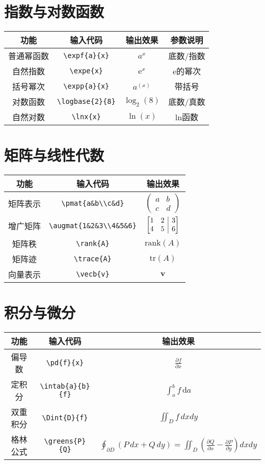 \documentclass[12pt,a4paper]{ctexart}
\makeatletter
\newcommand{\expf}[2]{#1^{#2}}  %
\newcommand{\expe}[1]{\mathrm{e}^{#1}}  %
\newcommand{\expp}[2]{#1^{\left( #2 \right)}}  %
\newcommand{\logbase}[2]{\log_{#1}\left( #2 \right)}  %
\newcommand{\lnx}[1]{\ln\left( #1 \right)}  %
\newcommand{\vecb}[1]{\mathbf{#1}} %
\newcommand{\rank}[1]{\mathrm{rank}(#1)} %
\newcommand{\trace}[1]{\mathrm{tr}(#1)} %
\newcommand{\Dint}[2]{\iint_{#1} #2 \, dx dy}
\newcommand{\diff}{\ensuremath{\,\mathrm{d}}}                   %
\newcommand{\pd}[2]{\ensuremath{\frac{\partial #1}{\partial #2}}} %
\newcommand{\intab}[3]{\ensuremath{\int_{#1}^{#2} #3 \diff #1}} %
\newcommand{\greens}[2]{%
	\oint_{\partial D} \left( #1 \, dx + #2 \, dy \right) = 
	\iint_{D} \left( \pd{#2}{x} - \pd{#1}{y} \right) dx dy
}
\newcommand{\pmat}[1]{%
	\begin{pmatrix}
		#1
	\end{pmatrix}
}
\newcommand{\augmat}[1]{%
	\left[\begin{array}{@{}cc|c@{}}  %
		#1
	\end{array}\right]
}
\makeatother
\begin{document}
	\section{指数与对数函数}
	\begin{tabular}{|c|c|c|c|}
		\hline
		功能 & 输入代码 & 输出效果 & 参数说明 \\
		\hline
		普通幂函数 & \verb|\expf{a}{x}| & $\expf{a}{x}$ & 底数/指数 \\
		\hline
		自然指数 & \verb|\expe{x}| & $\expe{x}$ & e的幂次 \\
		\hline
		括号幂次 & \verb|\expp{a}{x}| & $\expp{a}{x}$ & 带括号 \\
		\hline
		对数函数 & \verb|\logbase{2}{8}| & $\logbase{2}{8}$ & 底数/真数 \\
		\hline
		自然对数 & \verb|\lnx{x}| & $\lnx{x}$ & ln函数 \\
		\hline
	\end{tabular}
	
	\section{矩阵与线性代数}
	\begin{tabular}{|c|c|c|}
		\hline
		功能 & 输入代码 & 输出效果 \\
		\hline
		矩阵表示 & \verb|\pmat{a&b\\c&d}| & $\pmat{a&b\\c&d}$ \\
		\hline
		增广矩阵 & \verb|\augmat{1&2&3\\4&5&6}| & $\augmat{1&2&3\\4&5&6}$ \\
		\hline
		矩阵秩 & \verb|\rank{A}| & $\rank{A}$ \\
		\hline
		矩阵迹 & \verb|\trace{A}| & $\trace{A}$ \\
		\hline
		向量表示 & \verb|\vecb{v}| & $\vecb{v}$ \\
		\hline
	\end{tabular}
	
	\section{积分与微分}
	\begin{tabular}{|c|c|c|}
		\hline
		功能 & 输入代码 & 输出效果 \\
		\hline
		偏导数 & \verb|\pd{f}{x}| & $\pd{f}{x}$ \\
		\hline
		定积分 & \verb|\intab{a}{b}{f}| & $\intab{a}{b}{f}$ \\
		\hline
		双重积分 & \verb|\Dint{D}{f}| & $\Dint{D}{f}$ \\
		\hline
		格林公式 & \verb|\greens{P}{Q}| & $\greens{P}{Q}$ \\
		\hline
	\end{tabular}
	
\end{document}
